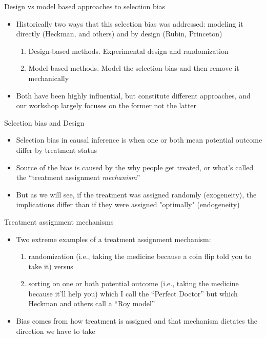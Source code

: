 \documentclass{beamer}
\begin{document}
\begin{frame}{Design vs model based approaches to selection bias}

\begin{itemize}

\item Historically two ways that this selection bias was addressed: modeling it directly (Heckman, and others) and by design (Rubin, Princeton)
	\begin{enumerate}
	\item Design-based methods.  Experimental design and randomization
	\item Model-based methods.  Model the selection bias and then remove it mechanically
	\end{enumerate}
\item Both have been highly influential, but constitute different approaches, and our workshop largely focuses on the former not the latter

\end{itemize}

\end{frame}





\begin{frame}{Selection bias and Design}

\begin{itemize}
\item Selection bias in causal inference is when one or both mean potential outcome differ by treatment status
\item Source of the bias is caused by the why people get treated, or what's called the ``treatment assignment \emph{mechanism}''
\item But as we will see, if the treatment was assigned randomly (exogeneity), the implications differ than if they were assigned "optimally" (endogeneity)


\end{itemize}

\end{frame}

\begin{frame}{Treatment assignment mechanisms}

\begin{itemize}
\item Two extreme examples of a treatment assignment mechanism: 
	\begin{enumerate}
	\item randomization (i.e., taking the medicine because a coin flip told you to take it) versus 
	\item sorting on one or both potential outcome (i.e., taking the medicine because it'll help you) which I call the ``Perfect Doctor'' but which Heckman and others call a ``Roy model''
	\end{enumerate}
\item Bias comes from how treatment is assigned and that mechanism dictates the direction we have to take

\end{itemize}

\end{frame}
\end{document}
